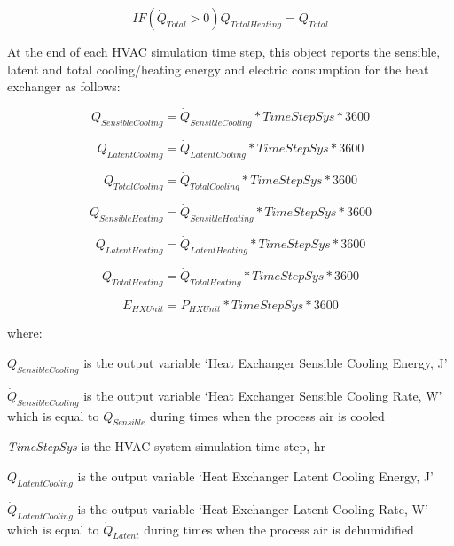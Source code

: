 \begin{equation}
IF \left( {{\dot{Q}_{Total}} > 0} \right){\dot{Q}_{TotalHeating}} = {\dot{Q}_{Total}}
\end{equation}

At the end of each HVAC simulation time step, this object reports the sensible, latent and total cooling/heating energy and electric consumption for the heat exchanger as follows:

\begin{equation}
{Q_{SensibleCooling}} = {\dot Q_{SensibleCooling}}*TimeStepSys*3600
\end{equation}

\begin{equation}
{Q_{LatentCooling}} = {\dot Q_{LatentCooling}}*TimeStepSys*3600
\end{equation}

\begin{equation}
{Q_{TotalCooling}} = {\dot Q_{TotalCooling}}*TimeStepSys*3600
\end{equation}

\begin{equation}
{Q_{SensibleHeating}} = {\dot Q_{SensibleHeating}}*TimeStepSys*3600
\end{equation}

\begin{equation}
{Q_{LatentHeating}} = {\dot Q_{LatentHeating}}*TimeStepSys*3600
\end{equation}

\begin{equation}
{Q_{TotalHeating}} = {\dot Q_{TotalHeating}}*TimeStepSys*3600
\end{equation}

\begin{equation}
{E_{HXUnit}} = {P_{HXUnit}}*TimeStepSys*3600
\end{equation}

where:

\(Q_{SensibleCooling}\) is the output variable `Heat Exchanger Sensible Cooling Energy, J'

\({\dot Q_{SensibleCooling}}\) is the output variable `Heat Exchanger Sensible Cooling Rate, W' which is equal to \({\dot Q_{Sensible}}\) during times when the process air is cooled

\emph{TimeStepSys} is the HVAC system simulation time step, hr

\(Q_{LatentCooling}\) is the output variable `Heat Exchanger Latent Cooling Energy, J'

\({\dot Q_{LatentCooling}}\) is the output variable `Heat Exchanger Latent Cooling Rate, W' which is equal to \({\dot Q_{Latent}}\) during times when the process air is dehumidified

